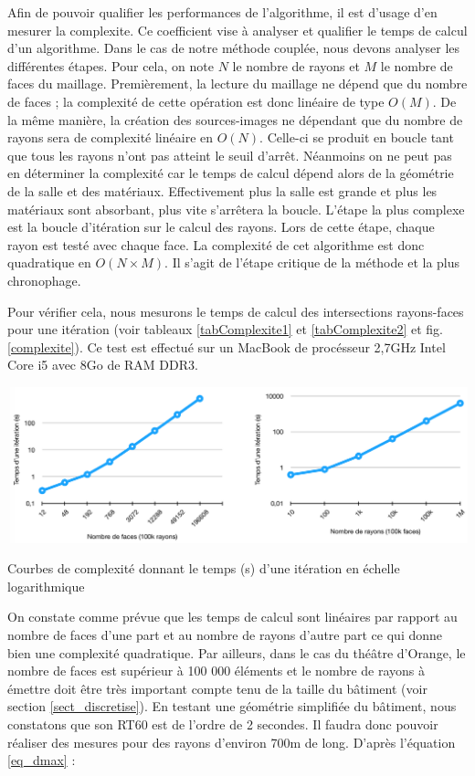 Afin de pouvoir qualifier les performances de l'algorithme, il est d'usage d'en mesurer la \gls{complexite}. Ce coefficient vise à analyser et qualifier le temps de calcul d'un algorithme. Dans le cas de notre méthode couplée, nous devons analyser les différentes étapes. Pour cela, on note $N$ le nombre de rayons et $M$ le nombre de faces du maillage. Premièrement, la lecture du maillage ne dépend que du nombre de faces ; la complexité de cette opération est donc linéaire de type $O(M)$. De la même manière, la création des sources-images ne dépendant que du nombre de rayons sera de complexité linéaire en $O(N)$. Celle-ci se produit en boucle tant que tous les rayons n'ont pas atteint le seuil d'arrêt. Néanmoins on ne peut pas en déterminer la  complexité car le temps de calcul dépend alors de la géométrie de la salle et des matériaux. Effectivement plus la salle est grande et plus les matériaux sont absorbant, plus vite s'arrêtera la boucle. L'étape la plus complexe est la boucle d'itération sur le calcul des rayons. Lors de cette étape, chaque rayon est testé avec chaque face. La complexité de cet algorithme est donc quadratique en $O(N \times M)$. Il s'agit de l'étape critique de la méthode et la plus chronophage.

Pour vérifier cela, nous mesurons le temps de calcul des intersections rayons-faces pour une itération (voir tableaux \ref{tabComplexite1} et \ref{tabComplexite2} et fig. \ref{complexite}). Ce test est effectué sur un MacBook de procésseur 2,7GHz Intel Core i5 avec 8Go de RAM DDR3.

 \begin{figureth}
	\includegraphics[width=\linewidth]{images/complexite0}
	\caption{Courbes de complexité donnant le temps (s) d'une itération en échelle logarithmique}
	\label{complexite0}
\end{figureth}

On constate comme prévue que les temps de calcul sont linéaires par rapport au nombre de faces d'une part et au nombre de rayons d'autre part ce qui donne bien une complexité quadratique. Par ailleurs, dans le cas du théâtre d'Orange, le nombre de faces est supérieur à 100 000 éléments et le nombre de rayons à émettre doit être très important compte tenu de la taille du bâtiment (voir section \ref{sect_discretise}). En testant une géométrie simplifiée du bâtiment, nous constatons que son \gls{RT60} est de l'ordre de 2 secondes. Il faudra donc pouvoir réaliser des mesures pour des rayons d'environ 700m de long. D'après l'équation \ref{eq_dmax} :

